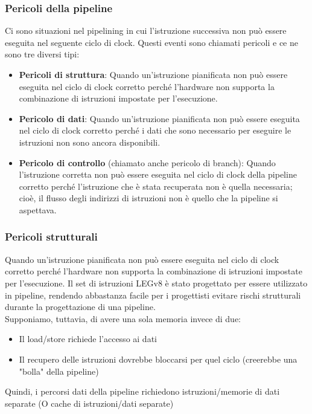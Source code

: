 \documentclass[12pt,a4paper]{article}
\begin{document}
\subsubsection{Pericoli della pipeline}
Ci sono situazioni nel pipelining in cui l'istruzione successiva non può essere eseguita nel seguente ciclo di clock. Questi eventi sono chiamati pericoli e ce ne sono tre diversi tipi:
\begin{itemize}
\item \textbf{Pericoli di struttura}: Quando un'istruzione pianificata non può essere eseguita nel ciclo di clock corretto perché l'hardware non supporta la combinazione di istruzioni impostate per l'esecuzione.
\item \textbf{Pericolo di dati}: Quando un'istruzione pianificata non può essere eseguita nel ciclo di clock corretto perché i dati che sono necessario per eseguire le istruzioni non sono ancora disponibili.
\item \textbf{Pericolo di controllo} (chiamato anche pericolo di branch): Quando l'istruzione corretta non può essere eseguita nel ciclo di clock della pipeline corretto perché l'istruzione che è stata recuperata non è quella necessaria; cioè, il flusso degli indirizzi di istruzioni non è quello che la pipeline si aspettava.
\end{itemize}

\subsubsection{Pericoli strutturali}
Quando un'istruzione pianificata non può essere eseguita nel ciclo di clock corretto perché l'hardware non supporta la combinazione di istruzioni impostate per l'esecuzione. Il set di istruzioni LEGv8 è stato progettato per essere utilizzato in pipeline, rendendo abbastanza facile per i progettisti evitare rischi strutturali durante la progettazione di una pipeline.\\
Supponiamo, tuttavia, di avere una sola memoria invece di due:
\begin{itemize}
\item Il load/store richiede l'accesso ai dati
\item Il recupero delle istruzioni dovrebbe bloccarsi per quel ciclo (creerebbe una "bolla" della pipeline)
\end{itemize}
Quindi, i percorsi dati della pipeline richiedono istruzioni/memorie di dati separate (O cache di istruzioni/dati separate)
\end{document}
